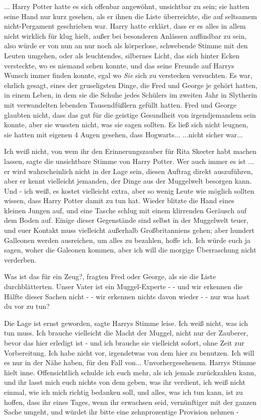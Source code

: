 ... Harry Potter hatte es sich offenbar angewöhnt, unsichtbar zu sein; sie
hatten seine Hand nur kurz gesehen, als er ihnen die Liste überreichte, die auf
seltsamem nicht-Pergament geschrieben war. Harry hatte erklärt, dass er es alles
in allem nicht wirklich für klug hielt, außer bei besonderen Anlässen auffindbar
zu sein, also würde er von nun an nur noch als körperlose, schwebende Stimme mit
den Leuten umgehen, oder als leuchtendes, silbernes Licht, das sich hinter Ecken
versteckte, wo es niemand sehen konnte, und das seine Freunde auf Harrys Wunsch
immer finden konnte, egal wo \emph{Sie} sich zu verstecken versuchten. Es war,
ehrlich gesagt, eines der gruseligsten Dinge, die Fred und George je gehört
hatten, in einem Leben, in dem sie die Schuhe jedes Schülers im zweiten Jahr in
Slytherin mit verwandelten lebenden Tausendfüßlern gefüllt hatten. Fred und
George glaubten nicht, dass das gut für die geistige Gesundheit von
irgendjemandem sein konnte, aber sie wussten nicht, was sie sagen sollten. Es
ließ sich nicht leugnen, sie hatten mit eigenen 4 Augen gesehen, dass
Hogwarts... ...nicht sicher war...

\glqq{}Ich weiß nicht, von wem ihr den Erinnerungszauber für Rita Skeeter habt
machen lassen\grqq{}, sagte die unsichtbare Stimme von Harry Potter. \glqq{}Wer
auch immer es ist ... er wird wahrscheinlich nicht in der Lage sein, diesen
Auftrag direkt auszuführen, aber er kennt vielleicht jemanden, der Dinge aus der
Muggelwelt besorgen kann. Und - ich weiß, es kostet vielleicht extra, aber so
wenig Leute wie möglich sollten wissen, dass Harry Potter damit zu tun
hat.\grqq{} Wieder blitzte die Hand eines kleinen Jungen auf, und eine Tasche
schlug mit einem klirrenden Geräusch auf dem Boden auf. \glqq{}Einige dieser
Gegenstände sind selbst in der Muggelwelt teuer, und euer Kontakt muss
vielleicht außerhalb Großbritanniens gehen; aber hundert Galleonen werden
ausreichen, um alles zu bezahlen, hoffe ich. Ich würde euch ja sagen, woher die
Galeonen kommen, aber ich will die morgige Überraschung nicht verderben.\grqq{}

\glqq{}Was ist das für ein Zeug?\grqq{}, fragten Fred oder George, als sie die
Liste durchblätterten. \glqq{}Unser Vater ist ein Muggel-Experte -\grqq{} \glqq{}-
und wir erkennen die Hälfte dieser Sachen nicht -\grqq{} \glqq{}- wir erkennen
nichts davon wieder -\grqq{} \glqq{}- nur was hast du vor zu tun?\grqq{}

\glqq{}Die Lage ist ernst geworden\grqq{}, sagte Harrys Stimme leise. \glqq{}Ich
weiß nicht, was ich tun muss. Ich brauche vielleicht die Macht der Muggel, nicht
nur der Zauberer, bevor das hier erledigt ist - und ich brauche sie vielleicht
sofort, ohne Zeit zur Vorbereitung. Ich habe nicht vor, irgendetwas von dem hier
zu benutzen. Ich will es nur in der Nähe haben, für den Fall von...
Unvorhergesehenem.\grqq{} Harrys Stimme hielt inne. \glqq{}Offensichtlich schulde
ich euch mehr, als ich jemals zurückzahlen kann, und ihr lasst mich euch nichts
von dem geben, was ihr verdient, ich weiß nicht einmal, wie ich mich richtig
bedanken soll, und alles, was ich tun kann, ist zu hoffen, dass ihr eines Tages,
wenn ihr erwachsen seid, vernünftiger mit der ganzen Sache umgeht, und würdet
ihr bitte eine zehnprozentige Provision nehmen -\grqq{}

